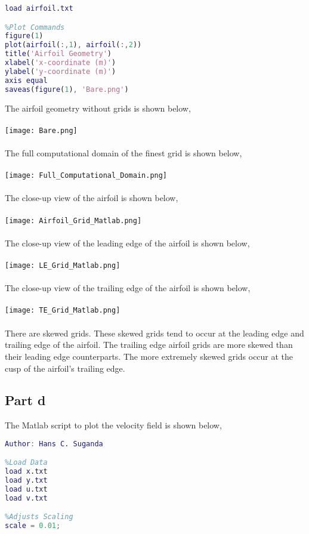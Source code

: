 \documentclass[a4paper, 12pt]{report}
\def\size{0.90}
\begin{document}
\begin{center}
\begin{lstlisting}[language=matlab]
%Load Data
load airfoil.txt

%Plot Commands
figure(1)
plot(airfoil(:,1), airfoil(:,2))
title('Airfoil Geometry')
xlabel('x-coordinate (m)')
ylabel('y-coordinate (m)')
axis equal
saveas(figure(1), 'Bare.png')
\end{lstlisting}
$$$$
The airfoil geometry without grids is shown below,
\\~\\\texttt{[image: Bare.png]}
\\~\\The full computational domain of the finest grid is shown below,
\\~\\\texttt{[image: Full\_Computational\_Domain.png]}
\\~\\The close-up view of the airfoil is shown below,
\\~\\\texttt{[image: Airfoil\_Grid\_Matlab.png]}
\\~\\The close-up view of the leading edge of the airfoil is shown below,
\\~\\\texttt{[image: LE\_Grid\_Matlab.png]}
\\~\\The close-up view of the trailing edge of the airfoil is shown below,
\\~\\\texttt{[image: TE\_Grid\_Matlab.png]}
\\~\\There are skewed grids. These skewed grids tend to occur at the leading edge and trailing edge of the airfoil. The trailing edge airfoil grids are more skewed than their leading edge counterparts. The more extremely skewed grids occur at the cusp of the airfoil's trailing edge.
\subsection{Part d}
The Matlab script to plot the velocity field is shown below,
\begin{lstlisting}[language = Matlab]
Author: Hans C. Suganda

%Load Data
load x.txt
load y.txt
load u.txt
load v.txt

%Adjusts Scaling
scale = 0.01;


\end{lstlisting}
\end{center}
\end{document}
